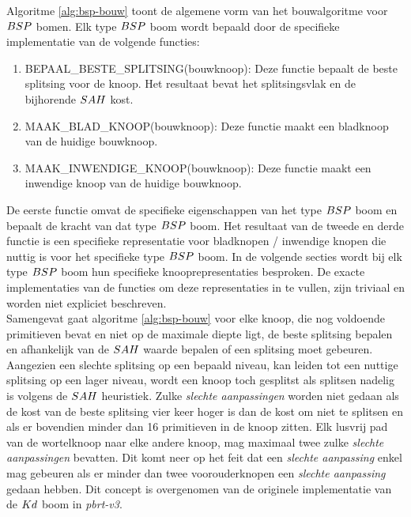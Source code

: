 Algoritme \ref{alg:bsp-bouw} toont de algemene vorm van het bouwalgoritme voor $BSP$ bomen.
Elk type $BSP$ boom wordt bepaald door de specifieke implementatie van de volgende functies:
\begin{enumerate}
    \item BEPAAL\_BESTE\_SPLITSING(bouwknoop): Deze functie bepaalt de beste splitsing voor de knoop. Het resultaat bevat het splitsingsvlak en de bijhorende $SAH$ kost.
    \item MAAK\_BLAD\_KNOOP(bouwknoop): Deze functie maakt een bladknoop van de huidige bouwknoop.
    \item MAAK\_INWENDIGE\_KNOOP(bouwknoop): Deze functie maakt een inwendige knoop van de huidige bouwknoop.
\end{enumerate}
De eerste functie omvat de specifieke eigenschappen van het type $BSP$ boom en bepaalt de kracht van dat type $BSP$ boom. 
Het resultaat van de tweede en derde functie is een specifieke representatie voor bladknopen / inwendige knopen die nuttig is voor het specifieke type $BSP$ boom.
In de volgende secties wordt bij elk type $BSP$ boom hun specifieke knooprepresentaties besproken.
De exacte implementaties van de functies om deze representaties in te vullen, zijn triviaal en worden niet expliciet beschreven.\\


Samengevat gaat algoritme \ref{alg:bsp-bouw} voor elke knoop, die nog voldoende primitieven bevat en niet op de maximale diepte ligt, de beste splitsing bepalen en afhankelijk van de $SAH$ waarde bepalen of een splitsing moet gebeuren. 
Aangezien een slechte splitsing op een bepaald niveau, kan leiden tot een nuttige splitsing op een lager niveau, wordt een knoop toch gesplitst als splitsen nadelig is volgens de $SAH$ heuristiek.
Zulke \textit{slechte aanpassingen} worden niet gedaan als de kost van de beste splitsing vier keer hoger is dan de kost om niet te splitsen en als er bovendien minder dan 16 primitieven in de knoop zitten.
Elk lusvrij pad van de wortelknoop naar elke andere knoop, mag maximaal twee zulke \textit{slechte aanpassingen} bevatten.
Dit komt neer op het feit dat een \textit{slechte aanpassing} enkel mag gebeuren als er minder dan twee voorouderknopen een \textit{slechte aanpassing} gedaan hebben.
Dit concept is overgenomen van de originele implementatie van de $Kd$ boom in \textit{pbrt-v3}.

